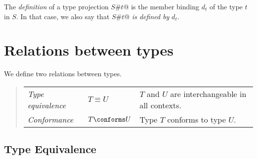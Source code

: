 The {\em definition} of a type projection \lstinline@$S$#$t$@ is the member
binding $d_t$ of the type $t$ in $S$. In that case, we also say
that \lstinline@$S$#$t$@ {\em is defined by} $d_t$.

\section{Relations between types}

We define two relations between types.
\begin{quote}\begin{tabular}{l@{\gap}l@{\gap}l}
\em Type equivalence & $T \equiv U$ & $T$ and $U$ are interchangeable
in all contexts.
\\
\em Conformance & $T \conforms U$ & Type $T$ conforms to type $U$.
\end{tabular}\end{quote}

\subsection{Type Equivalence}
\label{sec:type-equiv}

